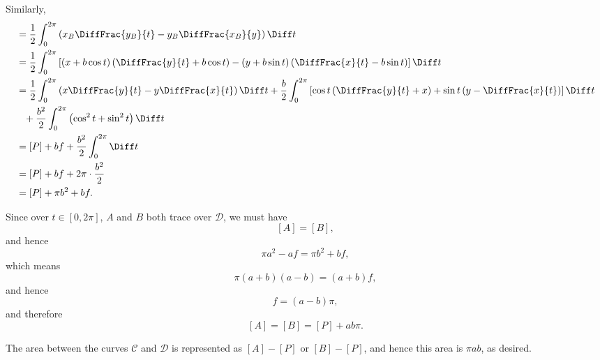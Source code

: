 Similarly,
\begin{align*}
    [B] & = \frac{1}{2} \int_{0}^{2\pi} \left(x_B \DiffFrac{y_B}{t} - y_B \DiffFrac{x_B}{y}\right) \Diff t                                                                                                                              \\
        & = \frac{1}{2} \int_{0}^{2\pi} \left[(x + b \cos t) \left(\DiffFrac{y}{t} + b \cos t\right) - (y + b \sin t) \left(\DiffFrac{x}{t} - b \sin t\right)\right] \Diff t                                                            \\
        & = \frac{1}{2} \int_{0}^{2\pi} \left(x \DiffFrac{y}{t} - y \DiffFrac{x}{t}\right) \Diff t + \frac{b}{2} \int_{0}^{2\pi} \left[\cos t \left(\DiffFrac{y}{t} + x\right) + \sin t \left(y - \DiffFrac{x}{t}\right)\right] \Diff t \\
        & \phantom{=} + \frac{b^2}{2} \int_{0}^{2\pi} \left(\cos^2 t + \sin^2 t\right) \Diff t                                                                                                                                          \\
        & = [P] + bf + \frac{b^2}{2} \int_{0}^{2\pi} \Diff t                                                                                                                                                                            \\
        & = [P] + bf + 2\pi \cdot \frac{b^2}{2}                                                                                                                                                                                         \\
        & = [P] + \pi b^2 + bf.
\end{align*}

Since over \(t \in [0, 2\pi]\), \(A\) and \(B\) both trace over \(\mathcal{D}\), we must have
\[
    [A] = [B],
\]
and hence
\[
    \pi a^2 - af = \pi b^2 + bf,
\]
which means
\[
    \pi (a + b) (a - b) = (a + b)f,
\]
and hence
\[
    f = (a - b)\pi,
\]
and therefore
\[
    [A] = [B] = [P] + ab\pi.
\]

The area between the curves \(\mathcal{C}\) and \(\mathcal{D}\) is represented as \([A] - [P]\) or \([B] - [P]\), and hence this area is \(\pi ab\), as desired.